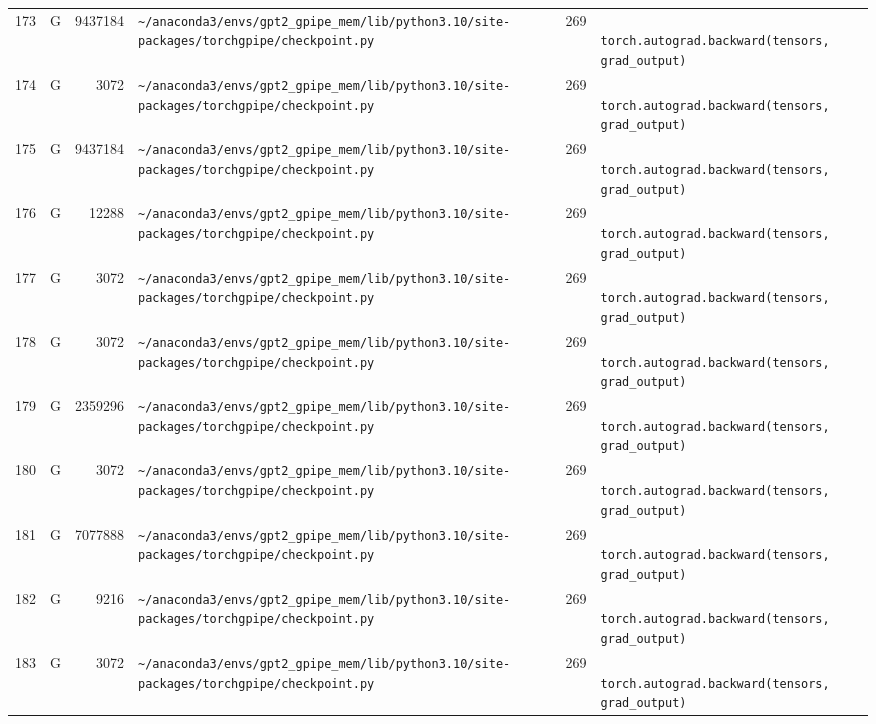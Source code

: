\documentclass{article}
\begin{document}
\begin{longtable}{r l r p{6.5cm} r p{7.0cm}}
173 & G & 9437184 & \lstinline|~/anaconda3/envs/gpt2_gpipe_mem/lib/python3.10/site-packages/torchgpipe/checkpoint.py| & 269 & \lstinline|            torch.autograd.backward(tensors, grad_output)| \\
174 & G & 3072 & \lstinline|~/anaconda3/envs/gpt2_gpipe_mem/lib/python3.10/site-packages/torchgpipe/checkpoint.py| & 269 & \lstinline|            torch.autograd.backward(tensors, grad_output)| \\
175 & G & 9437184 & \lstinline|~/anaconda3/envs/gpt2_gpipe_mem/lib/python3.10/site-packages/torchgpipe/checkpoint.py| & 269 & \lstinline|            torch.autograd.backward(tensors, grad_output)| \\
176 & G & 12288 & \lstinline|~/anaconda3/envs/gpt2_gpipe_mem/lib/python3.10/site-packages/torchgpipe/checkpoint.py| & 269 & \lstinline|            torch.autograd.backward(tensors, grad_output)| \\
177 & G & 3072 & \lstinline|~/anaconda3/envs/gpt2_gpipe_mem/lib/python3.10/site-packages/torchgpipe/checkpoint.py| & 269 & \lstinline|            torch.autograd.backward(tensors, grad_output)| \\
178 & G & 3072 & \lstinline|~/anaconda3/envs/gpt2_gpipe_mem/lib/python3.10/site-packages/torchgpipe/checkpoint.py| & 269 & \lstinline|            torch.autograd.backward(tensors, grad_output)| \\
179 & G & 2359296 & \lstinline|~/anaconda3/envs/gpt2_gpipe_mem/lib/python3.10/site-packages/torchgpipe/checkpoint.py| & 269 & \lstinline|            torch.autograd.backward(tensors, grad_output)| \\
180 & G & 3072 & \lstinline|~/anaconda3/envs/gpt2_gpipe_mem/lib/python3.10/site-packages/torchgpipe/checkpoint.py| & 269 & \lstinline|            torch.autograd.backward(tensors, grad_output)| \\
181 & G & 7077888 & \lstinline|~/anaconda3/envs/gpt2_gpipe_mem/lib/python3.10/site-packages/torchgpipe/checkpoint.py| & 269 & \lstinline|            torch.autograd.backward(tensors, grad_output)| \\
182 & G & 9216 & \lstinline|~/anaconda3/envs/gpt2_gpipe_mem/lib/python3.10/site-packages/torchgpipe/checkpoint.py| & 269 & \lstinline|            torch.autograd.backward(tensors, grad_output)| \\
183 & G & 3072 & \lstinline|~/anaconda3/envs/gpt2_gpipe_mem/lib/python3.10/site-packages/torchgpipe/checkpoint.py| & 269 & \lstinline|            torch.autograd.backward(tensors, grad_output)| \\

\end{longtable}
\end{document}
